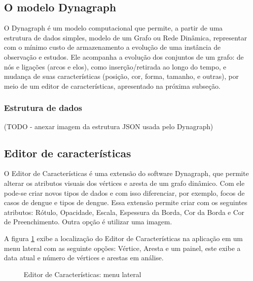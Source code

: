 \subsection{O modelo Dynagraph}

O Dynagraph \cite{dynagraph} é um modelo computacional que permite, a partir de uma estrutura de dados simples, modelo de um Grafo ou Rede Dinâmica, representar com o mínimo custo de armazenamento a evolução de uma instância de observação e estudos. Ele acompanha a evolução dos conjuntos de um grafo: de nós e ligações (arcos e elos), como inserção/retirada ao longo do tempo, e mudança de suas características (posição, cor, forma, tamanho, e outras), por meio de um editor de características, apresentado na próxima subseção.

\subsubsection{Estrutura de dados}

(TODO - anexar imagem da estrutura JSON usada pelo Dynagraph)

\subsection{Editor de características}
O Editor de Características é uma extensão do software Dynagraph, que permite alterar os atributos visuais dos vértices e aresta de um grafo dinâmico.
Com ele pode-se criar novos tipos de dados e com isso diferenciar, por exemplo, focos de casos de dengue e tipos de dengue.
Essa extensão permite criar com os seguintes atributos: Rótulo, Opacidade, Escala, Espessura da Borda, Cor da Borda e Cor de Preenchimento. Outra opção é utilizar uma imagem.
 
A figura \ref{fig:edCaMenu} exibe a localização do Editor de Características na aplicação em um menu lateral com as seguinte opções: Vértice, Aresta e um painel, este exibe a data atual e número de vértices e arestas em análise.
\begin{figure}[!h]
	\centering	
	\caption{\label{fig:edCaMenu} Editor de Características: menu lateral}
\end{figure}
\FloatBarrier

